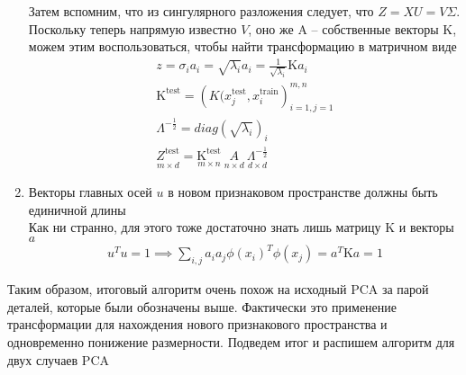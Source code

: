 \documentclass[12pt,fleqn]{article}
\begin{document}
\begin{enumerate}
Затем вспомним, что из сингулярного разложения следует, что $Z = XU = V\Sigma$. Поскольку теперь напрямую известно $V$, оно же $\text{A}$ -- собственные векторы $\text{K}$, можем этим воспользоваться, чтобы найти трансформацию в матричном виде
\begin{equation}
  \begin{array}{l} 
    z = \sigma_i a_i = \sqrt{\lambda_i}a_i = \frac{1}{\sqrt{\lambda_i}}\text{K} a_i\\
    \text{K}^{\text{test}} = \left(K(x_j^{\text{test}}, x_i^{\text{train}} \right)_{i=1, j=1}^{m, n} \\
    \Lambda^{-\frac{1}{2}} = diag(\sqrt{\lambda_i})_i \\
    \underset{m \times d}{Z^{\text{test}}} = \underset{m \times n}{\text{K}^{\text{test}}} \ \underset{n \times d}{A} \ \underset{d\times d}{\Lambda^{-\frac{1}{2}}}
  \end{array}
\end{equation}


\item Векторы главных осей $u$ в новом признаковом пространстве должны быть единичной длины  \\ Как ни странно, для этого тоже достаточно знать лишь матрицу $\text{K}$ и векторы $a$
\begin{equation}
  \begin{array}{l}
  u^Tu = 1 \implies \sum_{i, j} a_i a_j \phi(x_i)^T \phi(x_j) = a^T\text{K}a = 1
  \end{array}
\end{equation}
\end{enumerate}

Таким образом, итоговый алгоритм очень похож на исходный PCA за парой деталей, которые были обозначены выше. Фактически это применение трансформации для нахождения нового признакового пространства и одновременно понижение размерности. Подведем итог и распишем алгоритм для двух случаев PCA
\end{document}
